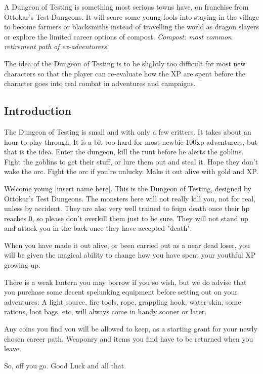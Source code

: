 A Dungeon of Testing is something most serious towns have, on franchise from Ottokar's Test Dungeons. It will scare some young fools into staying in the village to become farmers or blacksmiths instead of travelling the world as dragon slayers or explore the limited career options of compost. \emph{Compost: most common retirement path of ex-adventurers.}

The idea of the Dungeon of Testing is to be slightly too difficult for most new characters so that the player can re-evaluate how the XP are spent before the character goes into real combat in adventures and campaigns.




\subsection*{Introduction}

The Dungeon of Testing is small and with only a few critters. It takes about an hour to play through. It is a bit too hard for most newbie 100xp adventurers, but that is the idea. Enter the dungeon, kill the runt before he alerts the goblins. Fight the goblins to get their stuff, or lure them out and steal it. Hope they don't wake the orc. Fight the orc if you're unlucky. Make it out alive with gold and XP.

\begin{readoutloud}
Welcome young [insert name here]. This is the Dungeon of Testing, designed by Ottokar's Test Dungeons. The monsters here will not really kill you, not for real, unless by accident. They are also very well trained to feign death once their hp reaches 0, so please don't overkill them just to be sure. They will not stand up and attack you in the back once they have accepted "death".

When you have made it out alive, or been carried out as a near dead loser, you will be given the magical ability to change how you have spent your youthful XP growing up.

There is a weak lantern you may borrow if you so wish, but we do advise that you purchase some decent spelunking equipment before setting out on your adventures: A light source, fire tools, rope, grappling hook, water skin, some rations, loot bags, etc, will always come in handy sooner or later.

Any coins you find you will be allowed to keep, as a starting grant for your newly chosen career path. Weaponry and items you find have to be returned when you leave.

So, off you go. Good Luck and all that.
\end{readoutloud}

